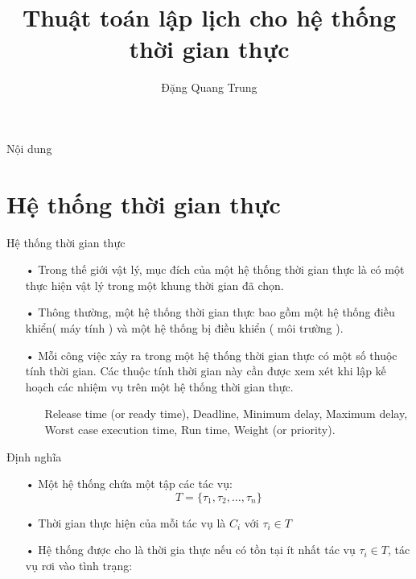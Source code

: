 \documentclass{beamer}
\title[]{{\huge \bf Thuật toán lập lịch cho hệ thống thời gian thực} \\}
\author[Đặng Quang Trung]{
Đặng Quang Trung\\
}
\institute[]{
Hệ Điều Hành
}
\begin{document}
\begin{frame}
\titlepage
\end{frame}
\begin{frame}{Nội dung}
\tableofcontents
\end{frame}
\section{Hệ thống thời gian thực}
\begin{frame}{Hệ thống thời gian thực}
\begin{itemize}
\item[•] Trong thế giới vật lý, mục đích của một hệ thống thời gian thực là có một thực hiện vật lý trong một khung thời gian đã chọn.
\item[•] Thông thường, một hệ thống thời gian thực bao gồm một hệ thống điều khiển( máy tính ) và một hệ thống bị điều khiển ( môi trường ).
\item[•] Mỗi công việc xảy ra trong một hệ thống thời gian thực có một số thuộc tính thời gian. Các thuộc tính thời gian này cần được xem xét khi lập kế hoạch các nhiệm vụ trên một hệ thống thời gian thực.
\begin{itemize}
\item[] Release time (or ready time), Deadline, Minimum delay, Maximum delay, Worst case execution time, Run time, Weight (or priority).
\end{itemize}
\end{itemize}
\end{frame}
\begin{frame}{Định nghĩa}
\begin{itemize}
\item[•] Một hệ thống chứa một tập các tác vụ:
\begin{displaymath}
T = \{\tau_1, \tau_2, \ldots, \tau_n\}
\end{displaymath}
\item[•] Thời gian thực hiện của mỗi tác vụ là $C_i$ với $\tau_i \in T$
\item[•]  Hệ thống được cho là thời gia thực nếu có tồn tại ít nhất tác vụ $\tau_i \in T$, tác vụ rơi vào tình trạng:
\end{itemize}
\end{frame}
\end{document}
